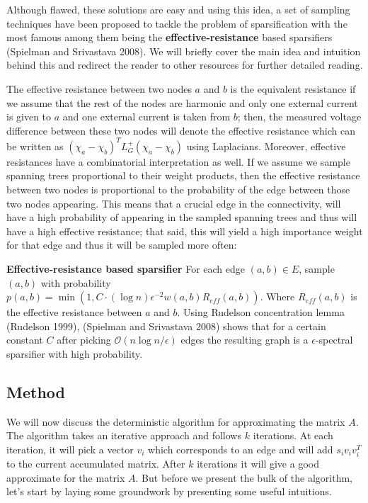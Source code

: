 \documentclass[
  letterpaper,
  DIV=11,
  numbers=noendperiod]{scrartcl}
\theoremstyle{plain}
\theoremstyle{plain}
\theoremstyle{plain}
\theoremstyle{definition}
\theoremstyle{remark}
\begin{document}
Although flawed, these solutions are easy and using this idea, a set of
sampling techniques have been proposed to tackle the problem of
sparsification with the most famous among them being the
\textbf{effective-resistance} based sparsifiers (Spielman and Srivastava
2008). We will briefly cover the main idea and intuition behind this and
redirect the reader to other resources for further detailed reading.

The effective resistance between two nodes \(a\) and \(b\) is the
equivalent resistance if we assume that the rest of the nodes are
harmonic and only one external current is given to \(a\) and one
external current is taken from \(b\); then, the measured voltage
difference between these two nodes will denote the effective resistance
which can be written as \((\chi_a - \chi_b)^T L^+_G (\chi_a - \chi_b)\)
using Laplacians. Moreover, effective resistances have a combinatorial
interpretation as well. If we assume we sample spanning trees
proportional to their weight products, then the effective resistance
between two nodes is proportional to the probability of the edge between
those two nodes appearing. This means that a crucial edge in the
connectivity, will have a high probability of appearing in the sampled
spanning trees and thus will have a high effective resistance; that
said, this will yield a high importance weight for that edge and thus it
will be sampled more often:

\textbf{Effective-resistance based sparsifier} For each edge
\((a, b) \in E\), sample \((a,b)\) with probability
\(p(a,b) = \min\left(1, C\cdot (\log n) \epsilon^{-2} w(a,b) R_{eff}(a, b)\right)\).
Where \(R_{eff}(a, b)\) is the effective resistance between \(a\) and
\(b\). Using Rudelson concentration lemma (Rudelson 1999), (Spielman and
Srivastava 2008) shows that for a certain constant \(C\) after picking
\(\mathcal{O}(n\log n /\epsilon)\) edges the resulting graph is a
\(\epsilon\)-spectral sparsifier with high probability.

\hypertarget{method}{%
\subsection{Method}\label{method}}

We will now discuss the deterministic algorithm for approximating the
matrix \(A\). The algorithm takes an iterative approach and follows
\(k\) iterations. At each iteration, it will pick a vector \(v_i\) which
corresponds to an edge and will add \(s_i v_i v_i^T\) to the current
accumulated matrix. After \(k\) iterations it will give a good
approximate for the matrix \(A\). But before we present the bulk of the
algorithm, let's start by laying some groundwork by presenting some
useful intuitions.
\end{document}
